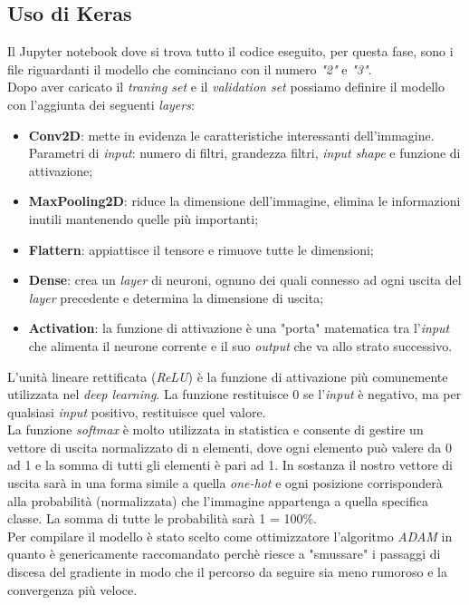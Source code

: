 \subsection{Uso di Keras}
Il Jupyter notebook dove si trova tutto il codice eseguito, per questa fase, sono i file riguardanti il modello che cominciano con il numero \textit{"2"} e \textit{"3"}.\\
Dopo aver caricato il \textit{traning set} e il \textit{validation set} possiamo definire il modello con l'aggiunta dei seguenti \textit{layers}:
\begin{itemize}
	\item \textbf{Conv2D}: mette in evidenza le caratteristiche interessanti dell'immagine. Parametri di \textit{input}: numero di filtri, grandezza filtri, \textit{input shape} e funzione di attivazione;
	\item \textbf{MaxPooling2D}: riduce la dimensione dell'immagine, elimina le informazioni inutili mantenendo quelle più importanti;
	\item \textbf{Flattern}: appiattisce il tensore e rimuove tutte le dimensioni;
	\item \textbf{Dense}: crea un \textit{layer} di neuroni, ognuno dei quali connesso ad ogni uscita del \textit{layer} precedente e determina la dimensione di uscita;
	\item \textbf{Activation}: la funzione di attivazione è una "porta" matematica tra l'\textit{input} che alimenta il neurone corrente e il suo \textit{output} che va allo strato successivo.
\end{itemize}
L'unità lineare rettificata (\textit{ReLU}) è la funzione di attivazione più comunemente utilizzata nel \textit{deep learning}. La funzione restituisce 0 se l'\textit{input} è negativo, ma per qualsiasi \textit{input} positivo, restituisce quel valore.\\
La funzione \textit{softmax} è molto utilizzata in statistica e consente di gestire un vettore di uscita normalizzato di n elementi, dove ogni elemento può valere da 0 ad 1 e la somma di tutti gli elementi è pari ad 1. In sostanza il nostro vettore di uscita sarà in una forma simile a quella \textit{one-hot} e ogni posizione corrisponderà alla probabilità (normalizzata) che l’immagine appartenga a quella specifica classe. La somma di tutte le probabilità sarà 1 = 100\%.\\
Per compilare il modello è stato scelto come ottimizzatore l'algoritmo \textit{ADAM} in quanto è genericamente raccomandato perchè riesce a "smussare" i passaggi di discesa del gradiente in modo che il percorso da seguire sia meno rumoroso e la convergenza più veloce.\\
